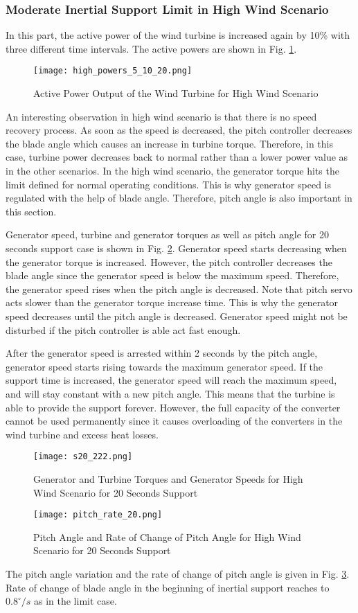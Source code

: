 \subsubsection{Moderate Inertial Support Limit in High Wind Scenario}
In this part, the active power of the wind turbine is increased again by 10\% with three different time intervals. The active powers are shown in Fig. \ref{high_powerss}.\par
\begin{figure}[h!]
	\centering
	\texttt{[image: high\_powers\_5\_10\_20.png]}
	\caption{Active Power Output of the Wind Turbine for High Wind Scenario}
	\label{high_powerss}
\end{figure}
An interesting observation in high wind scenario is that there is no speed recovery process. As soon as the speed is decreased, the pitch controller decreases the blade angle which causes an increase in turbine torque. Therefore, in this case, turbine power decreases back to normal rather than a lower power value as in the other scenarios. In the high wind scenario, the generator torque hits the limit defined for normal operating conditions. This is why generator speed is regulated with the help of blade angle. Therefore, pitch angle is also important in this section. \par
Generator speed, turbine and generator torques as well as pitch angle for 20 seconds support case is shown in Fig. \ref{high_s20}. Generator speed starts decreasing when the generator torque is increased. However, the pitch controller decreases the blade angle since the generator speed is below the maximum speed. Therefore, the generator speed rises when the pitch angle is decreased. Note that pitch servo acts slower than the generator torque increase time. This is why the generator speed decreases until the pitch angle is decreased. Generator speed might not be disturbed if the pitch controller is able act fast enough.\par
After the generator speed is arrested within 2 seconds by the pitch angle, generator speed starts rising towards the maximum generator speed. If the support time is increased, the generator speed will reach the maximum speed, and will stay constant with a new pitch angle. This means that the turbine is able to provide the support forever. However, the full capacity of the converter cannot be used permanently since it causes  overloading of the converters in the wind turbine and excess heat losses. \par
\begin{figure}[h!]
	\centering
	\texttt{[image: s20\_222.png]}
	\caption{Generator and Turbine Torques and Generator Speeds for High Wind Scenario for 20 Seconds Support}
	\label{high_s20}
\end{figure}
\begin{figure}[h!]
	\centering
	\texttt{[image: pitch\_rate\_20.png]}
	\caption{Pitch Angle and Rate of Change of Pitch Angle for High Wind Scenario for 20 Seconds Support}
	\label{high_pitch}
\end{figure}
The pitch angle variation and the rate of change of pitch angle is given in Fig. \ref{high_pitch}. Rate of change of blade angle in the beginning of inertial support reaches to $0.8^{\circ}/s$ as in the limit case.
